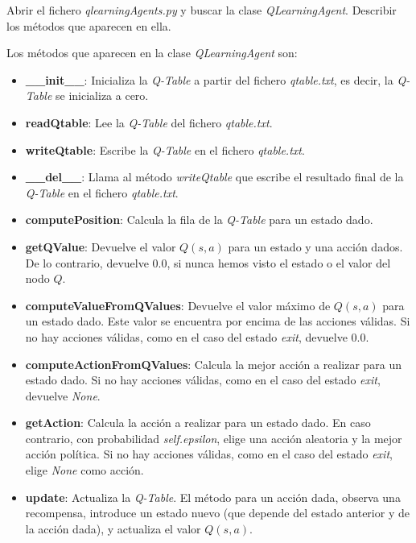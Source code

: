 \documentclass[11pt]{exam}
\begin{document}
\begin{questions}
{ \question Abrir el fichero \textit{qlearningAgents.py} y buscar la clase \textit{QLearningAgent}. Describir los métodos que aparecen en ella.
}

Los métodos que aparecen en la clase \textit{QLearningAgent} son:

\begin{itemize}
	\item \textbf{\_\_init\_\_}: Inicializa la \textit{Q-Table} a partir del fichero \textit{qtable.txt}, es decir, la \textit{Q-Table} se inicializa a cero.
	
	\item \textbf{readQtable}: Lee la \textit{Q-Table} del fichero \textit{qtable.txt}.
	
	\item \textbf{writeQtable}: Escribe la \textit{Q-Table} en el fichero \textit{qtable.txt}.
	
	\item \textbf{\_\_del\_\_}: Llama al método \textit{writeQtable} que escribe el resultado final de la \textit{Q-Table} en el fichero \textit{qtable.txt}.
	
	\item \textbf{computePosition}: Calcula la fila de la \textit{Q-Table} para un estado dado.
	
	\item \textbf{getQValue}: Devuelve el valor $Q(s,a)$ para un estado y una acción dados. De lo contrario, devuelve 0.0, si nunca hemos visto el estado o el valor del nodo $Q$.
	
	\item \textbf{computeValueFromQValues}: Devuelve el valor máximo de $Q(s,a)$ para un estado dado. Este valor se encuentra por encima de las acciones válidas. Si no hay acciones válidas, como en el caso del estado \textit{exit}, devuelve 0.0.
	
	\item \textbf{computeActionFromQValues}: Calcula la mejor acción a realizar para un estado dado. Si no hay acciones válidas, como en el caso del estado \textit{exit}, devuelve \textit{None}.
	
	\item \textbf{getAction}: Calcula la acción a realizar para un estado dado. En caso contrario, con probabilidad \textit{self.epsilon}, elige una acción aleatoria y la mejor acción política. Si no hay acciones válidas, como en el caso del estado \textit{exit}, elige \textit{None} como acción.
	
	\item \textbf{update}: Actualiza la \textit{Q-Table}. El método para un acción dada, observa una recompensa, introduce un estado nuevo (que depende del estado anterior y de la acción dada), y actualiza el valor $Q(s,a)$. 
	

\end{itemize}
\end{questions}
\end{document}
